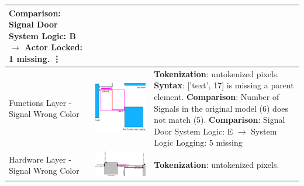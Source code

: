 \begin{longtable}{p{} >{\raggedright\arraybackslash}m{} >{\raggedright\arraybackslash}m{}}
        \textbf{Comparison}: Signal Door System Logic: B $\rightarrow$ Actor Locked: 1 missing. \newline
        \vdots \\
    \midrule
    Functions Layer - Signal Wrong Color & \includegraphics[width=1\linewidth]{pictures/32_signal_wrong_color_output_clip.png} & 
        \textbf{Tokenization}: untokenized pixels. \newline
        \textbf{Syntax}: ['text', 17] is missing a parent element. \newline
        \textbf{Comparison}: Number of Signals in the original model (6) does not match (5). \newline
        \textbf{Comparison}: Signal Door System Logic: E $\rightarrow$ System Logic Logging: 5 missing \\
    \midrule
    Hardware Layer - Signal Wrong Color & \includegraphics[width=1\linewidth]{pictures/33_signal_wrong_color_output_clip.png} & \textbf{Tokenization}: untokenized pixels. \\

\end{longtable}
